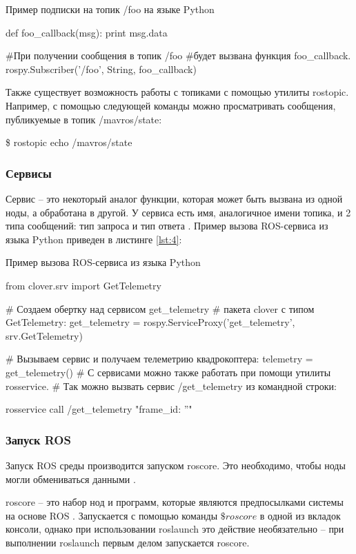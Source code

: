\begin{Program}[H]
	\caption{Пример подписки на топик /foo на языке Python} \label{lst:3}
\begin{MyCode}
def foo_callback(msg):
	print msg.data

#При получении сообщения в топик /foo
#будет вызвана функция foo_callback.
rospy.Subscriber('/foo', String, foo_callback)
\end{MyCode}
\end{Program}

Также существует возможность работы с топиками с помощью утилиты rostopic. Например, с помощью следующей команды можно просматривать сообщения, публикуемые в топик /mavros/state:

\$ rostopic echo /mavros/state
\subsubsection{Сервисы}

Сервис -- это некоторый аналог функции, которая может быть вызвана из одной ноды, а обработана в другой. У сервиса есть имя, аналогичное имени топика, и 2 типа сообщений: тип запроса и тип ответа \cite{clover}. Пример вызова ROS-сервиса из языка Python приведен в листинге \ref{lst:4}:

\begin{Program}[H]
	\caption{Пример вызова ROS-сервиса из языка Python} \label{lst:4}
\begin{MyCode}
from clover.srv import GetTelemetry

# Создаем обертку над сервисом get_telemetry
# пакета clover с типом GetTelemetry:
get_telemetry = rospy.ServiceProxy('get_telemetry',
srv.GetTelemetry)

# Вызываем сервис и получаем телеметрию квадрокоптера:
telemetry = get_telemetry()
# С сервисами можно также работать при помощи утилиты rosservice.
# Так можно вызвать сервис /get_telemetry из командной строки:

rosservice call /get_telemetry "{frame_id: ''}"
\end{MyCode}
\end{Program}

\subsubsection{Запуск ROS}
Запуск ROS среды производится запуском roscore. Это необходимо, чтобы ноды могли обмениваться данными \cite{pkg}.

roscore -- это набор нод и программ, которые являются предпосылками системы на основе ROS \cite{ros}. Запускается с помощью команды \(\$ roscore\) в одной из вкладок консоли, однако при использовании roslaunch это действие необязательно -- при выполнении roslaunch первым делом запускается roscore.

